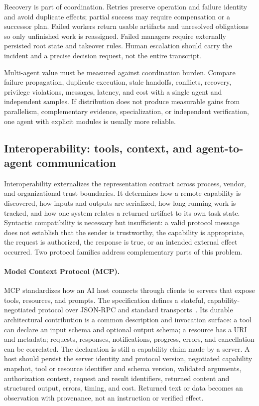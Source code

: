Recovery is part of coordination. Retries preserve operation and failure identity and avoid duplicate effects; partial success may require compensation or a successor plan. Failed workers return usable artifacts and unresolved obligations so only unfinished work is reassigned. Failed managers require externally persisted root state and takeover rules. Human escalation should carry the incident and a precise decision request, not the entire transcript.

Multi-agent value must be measured against coordination burden. Compare failure propagation, duplicate execution, stale handoffs, conflicts, recovery, privilege violations, messages, latency, and cost with a single agent and independent samples. If distribution does not produce measurable gains from parallelism, complementary evidence, specialization, or independent verification, one agent with explicit modules is usually more reliable.

\subsection{Interoperability: tools, context, and agent-to-agent communication}
\label{sec:protocols}

Interoperability externalizes the representation contract across process, vendor, and organizational trust boundaries. It determines how a remote capability is discovered, how inputs and outputs are serialized, how long-running work is tracked, and how one system relates a returned artifact to its own task state. Syntactic compatibility is necessary but insufficient: a valid protocol message does not establish that the sender is trustworthy, the capability is appropriate, the request is authorized, the response is true, or an intended external effect occurred. Two protocol families address complementary parts of this problem.

\paragraph{Model Context Protocol (MCP).}
MCP standardizes how an AI host connects through clients to servers that expose tools, resources, and prompts. The specification defines a stateful, capability-negotiated protocol over JSON-RPC and standard transports~\cite{mcp2025spec}. Its durable architectural contribution is a common description and invocation surface: a tool can declare an input schema and optional output schema; a resource has a URI and metadata; requests, responses, notifications, progress, errors, and cancellation can be correlated. The declaration is still a capability claim made by a server. A host should persist the server identity and protocol version, negotiated capability snapshot, tool or resource identifier and schema version, validated arguments, authorization context, request and result identifiers, returned content and structured output, errors, timing, and cost. Returned text or data becomes an observation with provenance, not an instruction or verified effect.

